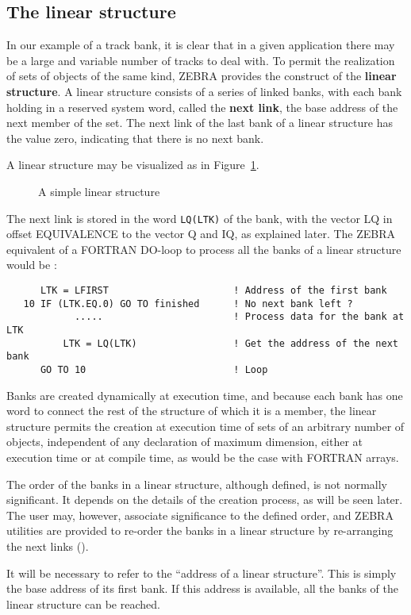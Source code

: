 \subsection{The linear structure}
\par
In our example of a track bank, it is clear that in a given application
there may be a large and variable number of tracks to deal with.
To permit the realization of sets of objects of the same kind, ZEBRA
provides the construct of the {\bf linear structure}.
A linear structure consists of a series of linked banks, with each bank
holding in a reserved system word, called the {\bf next link},
the base address of the next member of the set. The next link of the
last bank of a linear structure has the value zero, indicating that
there is no next bank.
\par
A linear structure may be visualized as in Figure~\ref{LINSTRU}.
\begin{figure}[h]
\caption{A simple linear structure}
\label{LINSTRU}
\end{figure}
The next link is stored in the word {\tt LQ(LTK)} of the bank,
with the vector LQ
in offset EQUIVALENCE to the vector Q and IQ, as explained later.
The ZEBRA equivalent of a FORTRAN DO-loop to process
all the banks of a linear structure would be :
\begin{verbatim}
      LTK = LFIRST                      ! Address of the first bank
   10 IF (LTK.EQ.0) GO TO finished      ! No next bank left ?
            .....                       ! Process data for the bank at LTK
          LTK = LQ(LTK)                 ! Get the address of the next bank
      GO TO 10                          ! Loop
\end{verbatim}
Banks are created dynamically at execution time, and because each
bank has one word to connect the rest of the structure of which it is a
member, the linear structure permits the creation at
execution time of sets of an arbitrary number of objects,
independent of any declaration of maximum dimension, either at
execution time or at compile time, as would be the case with FORTRAN
arrays.
\par
The order of the banks in a linear structure, although defined, is not
normally significant. It depends on the details of the creation process,
as will be seen later. The user may, however, associate significance to
the defined order, and ZEBRA utilities are provided to re-order the
banks in a linear structure by re-arranging the next links ().
\par
It will be necessary to refer to the
``address of a linear structure''.
This is simply the base address of its first bank. If this address is
available, all the banks of the linear structure can be reached.
